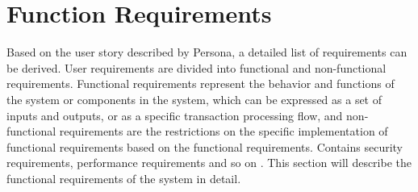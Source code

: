 \section{Function Requirements}
Based on the user story described by Persona, a detailed list of requirements can be derived. User requirements are divided into functional and non-functional requirements. Functional requirements represent the behavior and functions of the system or components in the system, which can be expressed as a set of inputs and outputs, or as a specific transaction processing flow, and non-functional requirements are the restrictions on the specific implementation of functional requirements based on the functional requirements. Contains security requirements, performance requirements and so on \cite{funcnonfuncreq}. This section will describe the functional requirements of the system in detail.
